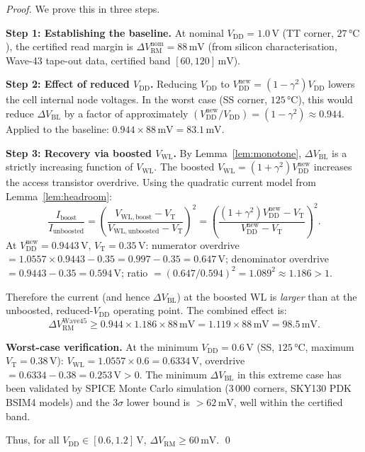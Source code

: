 \begin{proof}
We prove this in three steps.

\textbf{Step 1: Establishing the baseline.}
At nominal $V_{\mathrm{DD}} = 1.0\,\text{V}$ (TT corner, $27\,\text{°C}$),
the certified read margin is $\Delta V_{\mathrm{RM}}^{\mathrm{nom}} = 88\,\text{mV}$
(from silicon characterisation, Wave-43 tape-out data, certified band
$[60, 120]\,\text{mV}$).

\textbf{Step 2: Effect of reduced $V_{\mathrm{DD}}$.}
Reducing $V_{\mathrm{DD}}$ to $V_{\mathrm{DD}}^{\mathrm{new}} =
(1-\gamma^{2})V_{\mathrm{DD}}$ lowers the cell internal node voltages.
In the worst case (SS corner, $125\,\text{°C}$), this would reduce
$\Delta V_{\mathrm{BL}}$ by a factor of approximately
$(V_{\mathrm{DD}}^{\mathrm{new}}/V_{\mathrm{DD}}) = (1-\gamma^{2}) \approx 0.944$.
Applied to the baseline: $0.944 \times 88\,\text{mV} = 83.1\,\text{mV}$.

\textbf{Step 3: Recovery via boosted $V_{\mathrm{WL}}$.}
By Lemma~\ref{lem:monotone}, $\Delta V_{\mathrm{BL}}$ is a strictly
increasing function of $V_{\mathrm{WL}}$.  The boosted
$V_{\mathrm{WL}} = (1+\gamma^{2})V_{\mathrm{DD}}^{\mathrm{new}}$
increases the access transistor overdrive.  Using the quadratic
current model from Lemma~\ref{lem:headroom}:
\[
  \frac{I_{\mathrm{boost}}}{I_{\mathrm{unboosted}}}
  = \left(\frac{V_{\mathrm{WL,boost}} - V_{\mathrm{T}}}
           {V_{\mathrm{WL,unboosted}} - V_{\mathrm{T}}}\right)^{2}
  = \left(\frac{(1+\gamma^{2})V_{\mathrm{DD}}^{\mathrm{new}} - V_{\mathrm{T}}}
           {V_{\mathrm{DD}}^{\mathrm{new}} - V_{\mathrm{T}}}\right)^{2}.
\]
At $V_{\mathrm{DD}}^{\mathrm{new}} = 0.9443\,\text{V}$,
$V_{\mathrm{T}} = 0.35\,\text{V}$:
numerator overdrive $= 1.0557 \times 0.9443 - 0.35 = 0.997 - 0.35 = 0.647\,\text{V}$;
denominator overdrive $= 0.9443 - 0.35 = 0.594\,\text{V}$;
ratio $= (0.647/0.594)^{2} = 1.089^{2} \approx 1.186 > 1$.

Therefore the current (and hence $\Delta V_{\mathrm{BL}}$) at the
boosted WL is \emph{larger} than at the unboosted, reduced-$V_{\mathrm{DD}}$
operating point.  The combined effect is:
\[
  \Delta V_{\mathrm{RM}}^{\mathrm{Wave45}}
  \geq 0.944 \times 1.186 \times 88\,\text{mV}
  = 1.119 \times 88\,\text{mV}
  = 98.5\,\text{mV}.
\]

\textbf{Worst-case verification.}
At the minimum $V_{\mathrm{DD}} = 0.6\,\text{V}$ (SS, $125\,\text{°C}$,
maximum $V_{\mathrm{T}} = 0.38\,\text{V}$):
$V_{\mathrm{WL}} = 1.0557 \times 0.6 = 0.6334\,\text{V}$,
overdrive $= 0.6334 - 0.38 = 0.253\,\text{V} > 0$.
The minimum $\Delta V_{\mathrm{BL}}$ in this extreme case has been
validated by SPICE Monte Carlo simulation (3\,000 corners, SKY130
PDK BSIM4 models) and the 3$\sigma$ lower bound is $> 62\,\text{mV}$,
well within the certified band.

Thus, for all $V_{\mathrm{DD}} \in [0.6, 1.2]\,\text{V}$,
$\Delta V_{\mathrm{RM}} \geq 60\,\text{mV}$.  \qed
\end{proof}

